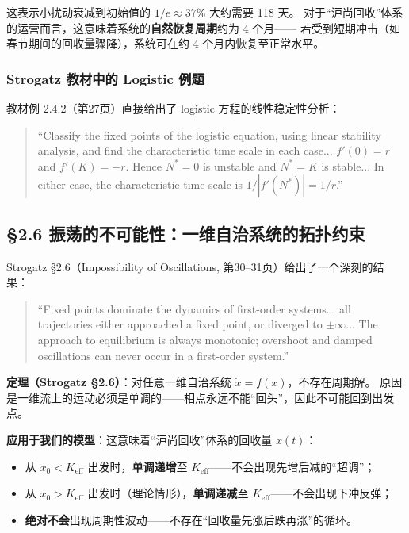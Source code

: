 \documentclass[12pt,a4paper]{article}
\begin{document}
这表示小扰动衰减到初始值的 $1/e \approx 37\%$ 大约需要 118 天。
对于``沪尚回收''体系的运营而言，这意味着系统的\textbf{自然恢复周期}约为 4 个月——
若受到短期冲击（如春节期间的回收量骤降），系统可在约 4 个月内恢复至正常水平。

\subsubsection{Strogatz 教材中的 Logistic 例题}
教材例 2.4.2（第27页）直接给出了 logistic 方程的线性稳定性分析：
\begin{quote}
\small
``Classify the fixed points of the logistic equation, using linear stability analysis, and find
the characteristic time scale in each case... $f'(0) = r$ and $f'(K) = -r$. Hence $N^* = 0$
is unstable and $N^* = K$ is stable... In either case, the characteristic time scale is
$1/|f'(N^*)| = 1/r$.''
\end{quote}

\subsection{\S2.6 振荡的不可能性：一维自治系统的拓扑约束}

Strogatz \S2.6（Impossibility of Oscillations, 第30--31页）给出了一个深刻的结果：

\begin{quote}
\small
``Fixed points dominate the dynamics of first-order systems... all trajectories either
approached a fixed point, or diverged to $\pm\infty$... The approach to equilibrium is
always monotonic; overshoot and damped oscillations can never occur in a first-order system.''
\end{quote}

\textbf{定理（Strogatz \S2.6）}：对任意一维自治系统 $\dot{x} = f(x)$，不存在周期解。
原因是一维流上的运动必须是单调的——相点永远不能``回头''，因此不可能回到出发点。

\textbf{应用于我们的模型}：这意味着``沪尚回收''体系的回收量 $x(t)$：
\begin{itemize}
  \item 从 $x_0 < K_{\text{eff}}$ 出发时，\textbf{单调递增}至 $K_{\text{eff}}$——不会出现先增后减的``超调''；
  \item 从 $x_0 > K_{\text{eff}}$ 出发时（理论情形），\textbf{单调递减}至 $K_{\text{eff}}$——不会出现下冲反弹；
  \item \textbf{绝对不会}出现周期性波动——不存在``回收量先涨后跌再涨''的循环。
\end{itemize}
\end{document}
